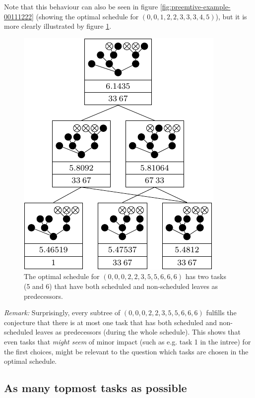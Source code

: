 Note that this behaviour can also be seen in figure \ref{fig:preemtive-example-00111222} (showing the optimal schedule for $(0,0,1,2,2,3,3,3,4,5)$), but it is more clearly illustrated by figure \ref{fig:filling-op-is-not-strictly-optimal}.

\begin{figure}[th]
  \centering
  \includegraphics{p3/suboptimal/00022355666_optimal_no_fill_up.pdf}
  \caption{The optimal schedule for $(0,0,0,2,2,3,5,5,6,6,6)$ has two tasks (5 and 6) that have both scheduled and non-scheduled leaves as predecessors.}
  \label{fig:filling-op-is-not-strictly-optimal}
\end{figure}

\emph{Remark:} Surprisingly, every subtree of $(0,0,0,2,2,3,5,5,6,6,6)$ fulfills the conjecture that there is at most one task that has both scheduled and non-scheduled leaves as predecessors (during the whole schedule). This shows that even tasks that \emph{might seem} of minor impact (such as e.g. task 1 in the intree) for the first choices, might be relevant to the question which tasks are chosen in the optimal schedule.

\subsection{As many topmost tasks as possible}
\label{sec:suboptimal-hlf-refinement-as-many-topmost-possible}

